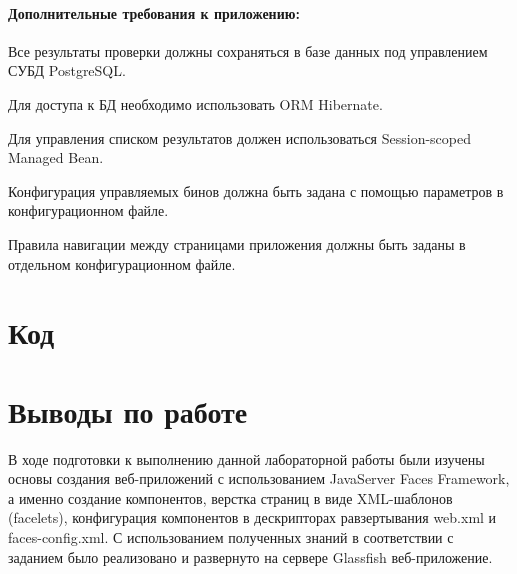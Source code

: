 \documentclass[a4paper, 12pt]{article}
\newenvironment{itemize*}%
  {\begin{itemize}%
    \setlength{\itemsep}{1pt}%
    \setlength{\parskip}{1pt}}%
  {\end{itemize}}
\begin{document}
\paragraph{Дополнительные требования к приложению:}
\begin{itemize*}
\item Все результаты проверки должны сохраняться в базе данных под управлением СУБД PostgreSQL.
\item Для доступа к БД необходимо использовать ORM Hibernate.
\item Для управления списком результатов должен использоваться Session-scoped Managed Bean.
\item Конфигурация управляемых бинов должна быть задана с помощью параметров в конфигурационном файле.
\item Правила навигации между страницами приложения должны быть заданы в отдельном конфигурационном файле.
\end{itemize*}

\newpage

\section{Код}













\section{Выводы по работе}
В ходе подготовки к выполнению данной лабораторной работы были изучены основы создания веб-приложений с использованием JavaServer Faces Framework, а именно создание компонентов, верстка страниц в виде XML-шаблонов (facelets), конфигурация компонентов в дескрипторах равзертывания web.xml и faces-config.xml. С использованием полученных знаний в соответствии с заданием было реализовано и развернуто на сервере Glassfish веб-приложение. 
\end{document}

